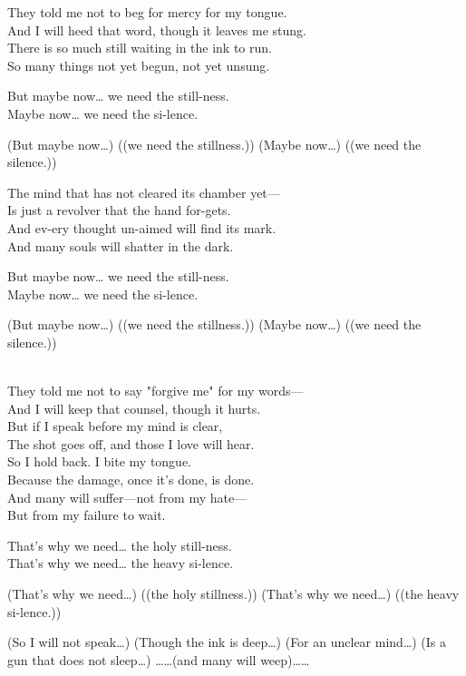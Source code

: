 \begin{lyrics}
They told me not to beg for mercy for my tongue.\\
And I will heed that word, though it leaves me stung.\\
There is so much still waiting in the ink to run.\\
So many things not yet begun, not yet unsung.

But maybe now… we need the still-ness.\\
Maybe now… we need the si-lence.

(But maybe now…) ((we need the stillness.))
(Maybe now…) ((we need the silence.))

The mind that has not cleared its chamber yet—\\
Is just a revolver that the hand for-gets.\\
And ev-ery thought un-aimed will find its mark.\\
And many souls will shatter in the dark.

But maybe now… we need the still-ness.\\
Maybe now… we need the si-lence.

(But maybe now…) ((we need the stillness.))
(Maybe now…) ((we need the silence.))

\\
They told me not to say "forgive me" for my words—\\
And I will keep that counsel, though it hurts.\\
But if I speak before my mind is clear,\\
The shot goes off, and those I love will hear.\\
So I hold back. I bite my tongue.\\
Because the damage, once it's done, is done.\\
And many will suffer—not from my hate—\\
But from my failure to wait.

That's why we need… the holy still-ness.\\
That's why we need… the heavy si-lence.

(That's why we need…) ((the holy stillness.))
(That's why we need…) ((the heavy si-lence.))

(So I will not speak…)
(Though the ink is deep…)
(For an unclear mind…)
(Is a gun that does not sleep…)
……(and many will weep)……
\end{lyrics}

